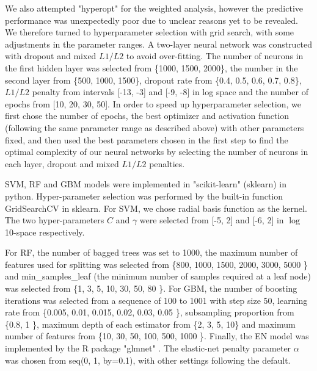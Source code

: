     We also attempted "hyperopt" for the weighted analysis, however the predictive performance was unexpectedly poor due to unclear reasons yet to be revealed. We therefore turned to hyperparameter selection with grid search, with some adjustments in the parameter ranges. A two-layer neural network was constructed with dropout and mixed $L1/L2$ to avoid over-fitting. The number of neurons in the first hidden layer was selected from \{1000, 1500, 2000\}, the number in the second layer from \{500, 1000, 1500\}, dropout rate from \{0.4, 0.5, 0.6, 0.7, 0.8\}, $L1/L2$ penalty from intervals [-13, -3] and [-9, -8] in log space and the number of epochs from [10, 20, 30, 50]. In order to speed up hyperparameter selection, we first chose the number of epochs, the best optimizer and activation function (following the same parameter range as described above) with other parameters fixed, and then used the best parameters chosen in the first step to find the optimal complexity of our neural networks by selecting the number of neurons in each layer, dropout and mixed $L1/L2$ penalties.

    SVM, RF and GBM models were implemented in "scikit-learn" (sklearn) in python. Hyper-parameter selection was performed by the built-in function GridSearchCV in sklearn. For SVM, we chose radial basis function as the kernel. The two hyper-parameters $C$ and $\gamma$ were selected from [-5, 2] and [-6, 2] in $\log$10-space respectively. 
    
    For RF, the number of bagged trees was set to 1000, the maximum number of features used for splitting was selected from \{800, 1000, 1500, 2000, 3000, 5000 \} and min\_samples\_leaf (the minimum number of samples required at a leaf node) was selected from \{1, 3, 5, 10, 30, 50, 80 \}. For GBM, the number of boosting iterations was selected from a sequence of 100 to 1001 with step size 50, learning rate from \{0.005, 0.01, 0.015, 0.02, 0.03, 0.05 \}, subsampling proportion from \{0.8, 1 \}, maximum depth of each estimator from \{2, 3, 5, 10\} and maximum number of features from \{10, 30, 50, 100, 500, 1000 \}. Finally, the EN model was implemented by the R package "glmnet" \cite{friedman2010regularization}. The elastic-net penalty parameter $\alpha$ was chosen from seq(0, 1, by=0.1), with other settings following the default.

